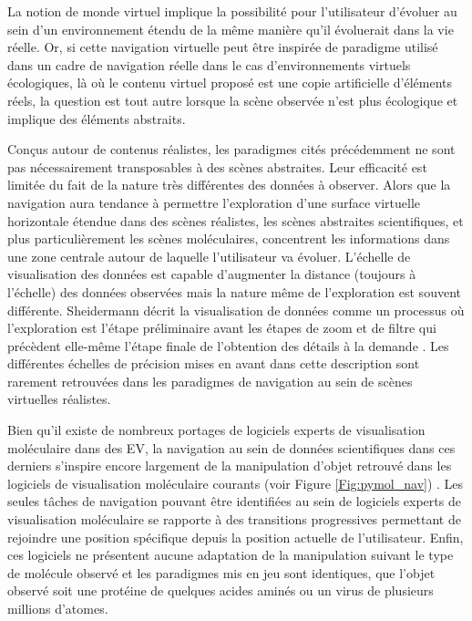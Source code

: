 La notion de monde virtuel implique la possibilité pour l'utilisateur d'évoluer au sein d'un environnement étendu de la même manière qu'il évoluerait dans la vie réelle. Or, si cette navigation virtuelle peut être inspirée de paradigme utilisé dans un cadre de navigation réelle dans le cas d'environnements virtuels écologiques, là où le contenu virtuel proposé est une copie artificielle d'éléments réels, la question est tout autre lorsque la scène observée n'est plus écologique et implique des éléments abstraits. 


Conçus autour de contenus réalistes, les paradigmes cités précédemment ne sont pas nécessairement transposables à des scènes abstraites. Leur efficacité est limitée du fait de la nature très différentes des données à observer. Alors que la navigation aura tendance à permettre l'exploration d'une surface virtuelle horizontale étendue dans des scènes réalistes, les scènes abstraites scientifiques, et plus particulièrement les scènes moléculaires, concentrent les informations dans une zone centrale autour de laquelle l'utilisateur va évoluer. L'échelle de visualisation des données est capable d'augmenter la distance (toujours à l'échelle) des données observées mais la nature même de l'exploration est souvent différente. Sheidermann décrit la visualisation de données comme un processus où l'exploration est l'étape préliminaire avant les étapes de zoom et de filtre qui précèdent elle-même l'étape finale de l'obtention des détails à la demande \cite{shneiderman_eyes_1996}. Les différentes échelles de précision mises en avant dans cette description sont rarement retrouvées dans les paradigmes de navigation au sein de scènes virtuelles réalistes.

Bien qu'il existe de nombreux portages de logiciels experts de visualisation moléculaire dans des EV, la navigation au sein de données scientifiques dans ces derniers s’inspire encore largement de la manipulation d'objet retrouvé dans les logiciels de visualisation moléculaire courants (voir Figure \ref{Fig:pymol_nav}) \cite{frohlich1999exploring}. Les seules tâches de navigation pouvant être identifiées au sein de logiciels experts de visualisation moléculaire se rapporte à des transitions progressives permettant de rejoindre une position spécifique depuis la position actuelle de l'utilisateur. Enfin, ces logiciels ne présentent aucune adaptation de la manipulation suivant le type de molécule observé et les paradigmes mis en jeu sont identiques, que l'objet observé soit une protéine de quelques acides aminés ou un virus de plusieurs millions d'atomes.

